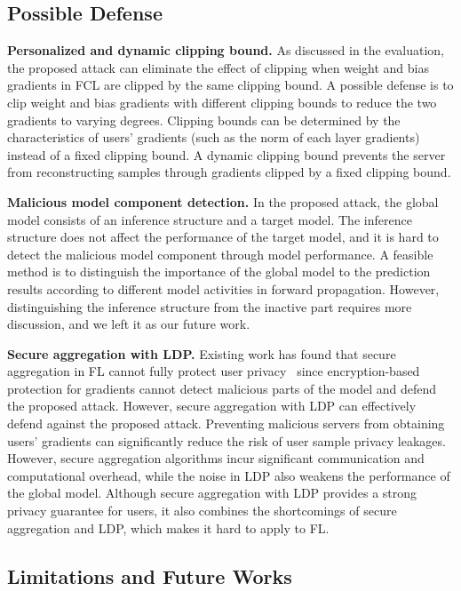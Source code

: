\documentclass[lettersize,journal]{IEEEtran}
\begin{document}
\begin{appendices}
\subsection{Possible Defense}

\textbf{Personalized and dynamic clipping bound.}
As discussed in the evaluation, the proposed attack can eliminate the effect of clipping when weight and bias gradients in FCL are clipped by the same clipping bound. A possible defense is to clip weight and bias gradients with different clipping bounds to reduce the two gradients to varying degrees. Clipping bounds can be determined by the characteristics of users' gradients (such as the norm of each layer gradients) instead of a fixed clipping bound.  A dynamic clipping bound prevents the server from reconstructing samples through gradients clipped by a fixed clipping bound.

\textbf{Malicious model component detection.}
In the proposed attack, the global model consists of an inference structure and a target model. The inference structure does not affect the performance of the target model, and it is hard to detect the malicious model component through model performance. A feasible method is to distinguish the importance of the global model to the prediction results according to different model activities in forward propagation. However, distinguishing the inference structure from the inactive part requires more discussion, and we left it as our future work.

\textbf{Secure aggregation with LDP.}
Existing work has found that secure aggregation in FL cannot fully protect user privacy~\cite{Pasquini2022secure} since encryption-based protection for gradients cannot detect malicious parts of the model and defend the proposed attack. However, secure aggregation with LDP can effectively defend against the proposed attack. Preventing malicious servers from obtaining users' gradients can significantly reduce the risk of user sample privacy leakages. However, secure aggregation algorithms incur significant communication and computational overhead, while the noise in LDP also weakens the performance of the global model. Although secure aggregation with LDP provides a strong privacy guarantee for users, it also combines the shortcomings of secure aggregation and LDP, which makes it hard to apply to FL.

\subsection{Limitations and Future Works}


\end{appendices}
\end{document}
